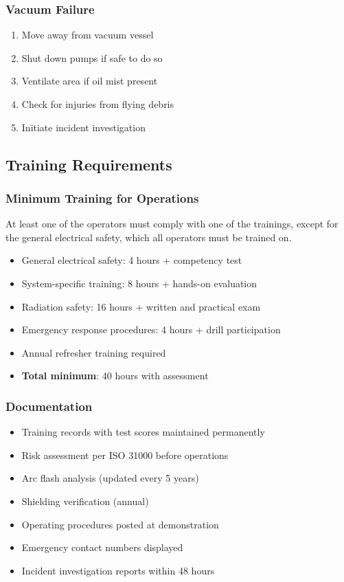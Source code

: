 \subsubsection{Vacuum Failure}
\begin{enumerate}[noitemsep]
    \item Move away from vacuum vessel
    \item Shut down pumps if safe to do so
    \item Ventilate area if oil mist present
    \item Check for injuries from flying debris
    \item Initiate incident investigation
\end{enumerate}

\subsection{Training Requirements}

\subsubsection{Minimum Training for Operations}
At least one of the operators must comply with one of the trainings, except for the general electrical safety, which all operators must be trained on.
\begin{itemize}[noitemsep]
    \item General electrical safety: 4 hours + competency test
    \item System-specific training: 8 hours + hands-on evaluation
    \item Radiation safety: 16 hours + written and practical exam
    \item Emergency response procedures: 4 hours + drill participation
    \item Annual refresher training required
    \item \textbf{Total minimum}: 40 hours with assessment
\end{itemize}

\subsubsection{Documentation}
\begin{itemize}[noitemsep]
    \item Training records with test scores maintained permanently
    \item Risk assessment per ISO 31000 before operations
    \item Arc flash analysis (updated every 5 years)
    \item Shielding verification (annual)
    \item Operating procedures posted at demonstration
    \item Emergency contact numbers displayed
    \item Incident investigation reports within 48 hours
\end{itemize}

